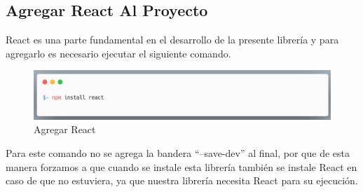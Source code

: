     
    \subsection{Agregar React Al Proyecto}
    React es una parte fundamental en el desarrollo de la presente librería y para agregarlo es necesario ejecutar el siguiente comando.
    \newline
    \newline
     \begin{figure}[H]
    \includegraphics[width=1\textwidth]{./Imagenes/image23.png}
    \caption[Agregar React]{Agregar React}
    \end{figure}
    \newline
    \newline
    Para este comando no se agrega la bandera “–save-dev” al final, por que de esta manera forzamos a que cuando se instale esta librería también se instale React en caso de que no estuviera, ya que nuestra librería necesita React para su ejecución.
    
    
